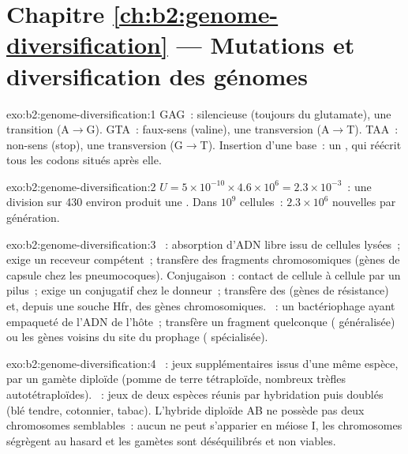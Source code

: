 \section*{Chapitre \ref{ch:b2:genome-diversification} --- Mutations et diversification des génomes}

\begin{solution}{exo:b2:genome-diversification:1}
GAG~: silencieuse (toujours du glutamate), une transition (A$\to$G).
GTA~: faux-sens (valine), une transversion (A$\to$T). TAA~: non-sens
(stop), une transversion (G$\to$T). Insertion d'une base~: un , qui réécrit tous les codons situés après elle.
\end{solution}

\begin{solution}{exo:b2:genome-diversification:2}
$U = 5\times 10^{-10}\times 4.6\times 10^{6} = 2.3\times 10^{-3}$~: une
division sur 430 environ produit une . Dans $10^{9}$ cellules~:
$2.3\times 10^{6}$  nouvelles par génération.
\end{solution}

\begin{solution}{exo:b2:genome-diversification:3}
~: absorption d'ADN libre issu de cellules lysées~; exige
un receveur compétent~; transfère des fragments chromosomiques (gènes de
capsule chez les pneumocoques). Conjugaison~: contact de cellule à
cellule par un pilus~; exige un  conjugatif chez le donneur~;
transfère des  (gènes de résistance) et, depuis une souche Hfr,
des gènes chromosomiques. ~: un bactériophage ayant
empaqueté de l'ADN de l'hôte~; transfère un fragment quelconque
( généralisée) ou les gènes voisins du site du prophage
( spécialisée).
\end{solution}

\begin{solution}{exo:b2:genome-diversification:4}
~: jeux supplémentaires issus d'une même espèce, par un
gamète diploïde (pomme de terre tétraploïde, nombreux trèfles
autotétraploïdes). ~: jeux de deux espèces réunis par
hybridation puis doublés (blé tendre, cotonnier, tabac). L'hybride
diploïde AB ne possède pas deux chromosomes semblables~: aucun ne peut
s'apparier en méiose I, les chromosomes ségrègent au hasard et les
gamètes sont déséquilibrés et non viables.
\end{solution}

